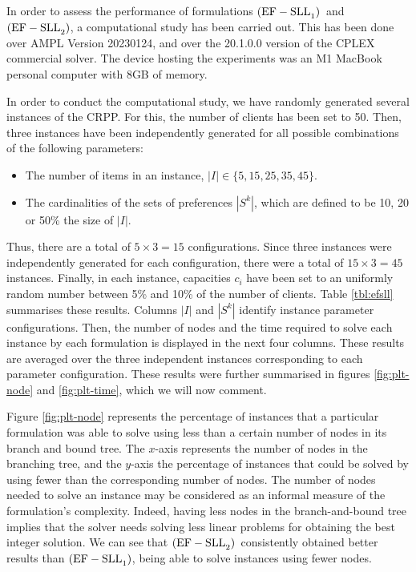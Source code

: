 \newcommand{\efslla}{$\rm{(EF-SLL}_1\rm{)}$}
\newcommand{\efsllb}{$\rm{(EF-SLL}_2\rm{)}$}

In order to assess the performance of formulations \efslla~and \efsllb, a
computational study has been carried out. This has been done over AMPL Version
20230124, and over the 20.1.0.0 version of the CPLEX commercial solver. The
device hosting the experiments was an M1 MacBook personal computer with 8GB of
memory.

In order to conduct the computational study, we have randomly generated several
instances of the CRPP. For this, the number of clients has been set to 50. Then,
three instances have been independently generated for all possible combinations
of the following parameters:
\begin{itemize}
    \item
	The number of items in an instance, $| I | \in \{5, 15, 25, 35, 45\}$.
    \item
	The cardinalities of the sets of preferences $|S^k|$, which are defined
	to be 10, 20 or 50\% the size of $|I|$.
\end{itemize}
Thus, there are a total of $5 \times 3 = 15$ configurations. Since three
instances were independently generated for each configuration, there were a
total of $15 \times 3 = 45$ instances. Finally, in each instance, capacities
$c_i$ have been set to an uniformly random number between 5\% and 10\% of the
number of clients. Table \ref{tbl:efsll} summarises these results. Columns $|I|$
and $|S^k|$ identify instance parameter configurations.  Then, the number of
nodes and the time required to solve each instance by each formulation is
displayed in the next four columns. These results are averaged over the three
independent instances corresponding to each parameter configuration.  These
results were further summarised in figures \ref{fig:plt-node} and
\ref{fig:plt-time}, which we will now comment.

Figure \ref{fig:plt-node} represents the percentage of instances that a
particular formulation was able to solve using less than a certain number of
nodes in its branch and bound tree. The $x$-axis represents the number of nodes
in the branching tree, and the $y$-axis the percentage of instances that could
be solved by using fewer than the corresponding number of nodes. The number of
nodes needed to solve an instance may be considered as an informal measure of
the formulation's complexity. Indeed, having less nodes in the branch-and-bound
tree implies that the solver needs solving less linear problems for obtaining
the best integer solution. We can see that \efsllb~consistently obtained better
results than \efslla, being able to solve instances using fewer nodes.

